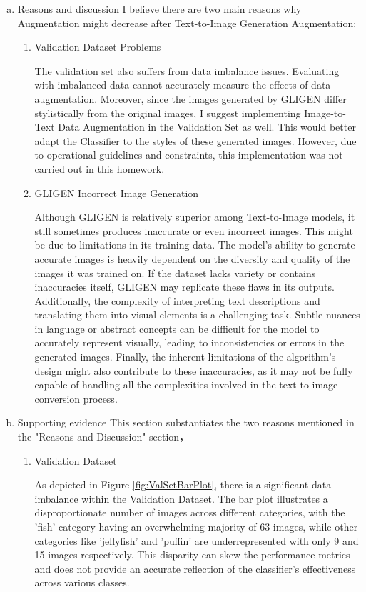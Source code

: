 \documentclass[10pt,a4paper]{article}
\begin{document}
\begin{enumerate}[(a)]
\begin{itemize}
\end{itemize}
\item Reasons and discussion
I believe there are two main reasons why Augmentation might decrease after Text-to-Image Generation Augmentation:
\begin{enumerate}[(1)]
\item Validation Dataset Problems

The validation set also suffers from data imbalance issues. Evaluating with imbalanced data cannot accurately measure the effects of data augmentation. Moreover, since the images generated by GLIGEN differ stylistically from the original images, I suggest implementing Image-to-Text Data Augmentation in the Validation Set as well. This would better adapt the Classifier to the styles of these generated images. However, due to operational guidelines and constraints, this implementation was not carried out in this homework.

\item GLIGEN Incorrect Image Generation

Although GLIGEN is relatively superior among Text-to-Image models, it still sometimes produces inaccurate or even incorrect images. This might be due to limitations in its training data. The model's ability to generate accurate images is heavily dependent on the diversity and quality of the images it was trained on. If the dataset lacks variety or contains inaccuracies itself, GLIGEN may replicate these flaws in its outputs. Additionally, the complexity of interpreting text descriptions and translating them into visual elements is a challenging task. Subtle nuances in language or abstract concepts can be difficult for the model to accurately represent visually, leading to inconsistencies or errors in the generated images. Finally, the inherent limitations of the algorithm's design might also contribute to these inaccuracies, as it may not be fully capable of handling all the complexities involved in the text-to-image conversion process.
\end{enumerate}


\item Supporting evidence
This section substantiates the two reasons mentioned in the "Reasons and Discussion" section，
\begin{enumerate}[(1)]
\item Validation Dataset 

As depicted in Figure \ref{fig:ValSetBarPlot}, there is a significant data imbalance within the Validation Dataset. The bar plot illustrates a disproportionate number of images across different categories, with the 'fish' category having an overwhelming majority of 63 images, while other categories like 'jellyfish' and 'puffin' are underrepresented with only 9 and 15 images respectively. This disparity can skew the performance metrics and does not provide an accurate reflection of the classifier's effectiveness across various classes.


\end{enumerate}
\end{enumerate}
\end{document}

